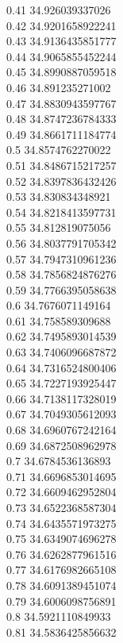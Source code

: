 {0.41	34.926039337026\\
0.42	34.9201658922241\\
0.43	34.9136435851777\\
0.44	34.9065855452244\\
0.45	34.8990887059518\\
0.46	34.891235271002\\
0.47	34.8830943597767\\
0.48	34.8747236784333\\
0.49	34.8661711184774\\
0.5	34.8574762270022\\
0.51	34.8486715217257\\
0.52	34.8397836432426\\
0.53	34.830834348921\\
0.54	34.8218413597731\\
0.55	34.812819075056\\
0.56	34.8037791705342\\
0.57	34.7947310961236\\
0.58	34.7856824876276\\
0.59	34.7766395058638\\
0.6	34.7676071149164\\
0.61	34.758589309688\\
0.62	34.7495893014539\\
0.63	34.7406096687872\\
0.64	34.7316524800406\\
0.65	34.7227193925447\\
0.66	34.7138117328019\\
0.67	34.7049305612093\\
0.68	34.6960767242164\\
0.69	34.6872508962978\\
0.7	34.6784536136893\\
0.71	34.6696853014695\\
0.72	34.6609462952804\\
0.73	34.6522368587304\\
0.74	34.6435571973275\\
0.75	34.6349074696278\\
0.76	34.6262877961516\\
0.77	34.6176982665108\\
0.78	34.6091389451074\\
0.79	34.6006098756891\\
0.8	34.5921110849933\\
0.81	34.5836425856632\\
}
